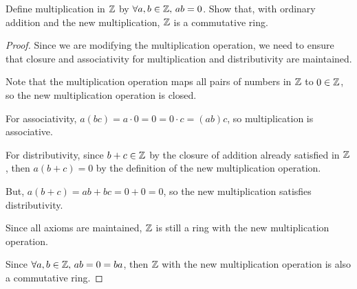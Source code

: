 \documentclass[../hw2]{subfiles}
\begin{document}
\begin{problem}[10]
Define multiplication in $\mathbb{Z}$ by $\forall a,b\in \mathbb{Z},\, ab=0$.
Show that, with ordinary addition and the new multiplication, $\mathbb{Z}$ is a commutative ring.
\end{problem}
\begin{proof}
	Since we are modifying the multiplication operation, we need to ensure that closure and associativity for multiplication and distributivity are maintained.

	Note that the multiplication operation maps all pairs of numbers in $\mathbb{Z}$ to $0\in \mathbb{Z}$, so the new multiplication operation is closed.

	For associativity, $a(bc) = a\cdot 0 = 0 = 0\cdot c = (ab)c$, so multiplication is associative.

	For distributivity, since $b+c\in \mathbb{Z}$ by the closure of addition already satisfied in $\mathbb{Z}$, then $a(b+c) = 0$ by the definition of the new multiplication operation.

	But,  $a(b+c)=ab+bc=0+0=0$, so the new multiplication satisfies distributivity.

	Since all axioms are maintained, $\mathbb{Z}$ is still a ring with the new multiplication operation.

	Since $\forall a,b\in \mathbb{Z},\, ab=0=ba$, then $\mathbb{Z}$ with the new multiplication operation is also a commutative ring.
\end{proof}
\end{document}
